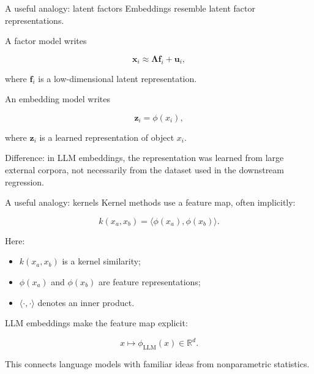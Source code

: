 \documentclass[aspectratio=169]{beamer}
\newcommand{\R}{\mathbb{R}}
\newcommand{\vect}[1]{\boldsymbol{#1}}
\begin{document}
\begin{frame}{A useful analogy: latent factors}
\large
Embeddings resemble latent factor representations.

\vspace{0.2cm}

A factor model writes

\[
\vect{x}_i \approx \vect{\Lambda}\vect{f}_i + \vect{u}_i,
\]

where \(\vect{f}_i\) is a low-dimensional latent representation.

\vspace{0.25cm}

An embedding model writes

\[
\vect{z}_i = \phi(x_i),
\]

where \(\vect{z}_i\) is a learned representation of object \(x_i\).

\vspace{0.25cm}

\begin{bluebox}
Difference: in LLM embeddings, the representation was learned from large external corpora, not necessarily from the dataset used in the downstream regression.
\end{bluebox}
\end{frame}

\begin{frame}{A useful analogy: kernels}
\large
Kernel methods use a feature map, often implicitly:

\[
k(x_a,x_b)=\langle \phi(x_a),\phi(x_b)\rangle.
\]

\vspace{0.25cm}

Here:
\begin{itemize}
  \item \(k(x_a,x_b)\) is a kernel similarity;
  \item \(\phi(x_a)\) and \(\phi(x_b)\) are feature representations;
  \item \(\langle \cdot,\cdot \rangle\) denotes an inner product.
\end{itemize}

\vspace{0.25cm}

LLM embeddings make the feature map explicit:

\[
x \mapsto \phi_{\text{LLM}}(x) \in \R^d.
\]

\vspace{0.15cm}

This connects language models with familiar ideas from nonparametric statistics.
\end{frame}
\end{document}

